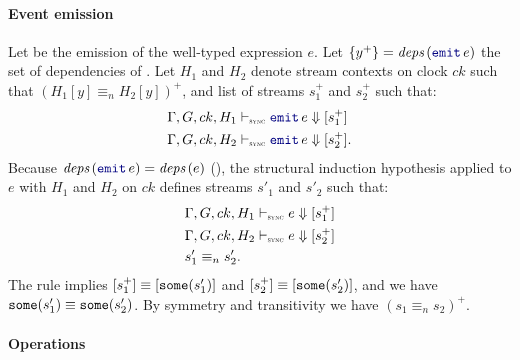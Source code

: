 \begin{skippableproof}
    \paragraph{Event emission}

    Let  be the emission of the well-typed expression $e$. Let $\{y^+\} = \deps{\emit{e}}$
    the set of dependencies of . Let $H_1$ and $H_2$ denote stream contexts on clock $ck$
    such that $(H_1[y] \equiv_n H_2[y])^+$, and list of streams $s_1^+$ and $s_2^+$ such that:
    \begin{align*}
         & \exprDenot{H_1}{ck}{\emit{e}}{s_1^+}  \\
         & \exprDenot{H_2}{ck}{\emit{e}}{s_2^+}.
    \end{align*}
    Because $\deps{\emit{e}} = \deps{e}$ (), the structural induction hypothesis applied to $e$ with $H_1$ and $H_2$ on $ck$
    defines streams $s'_1$ and $s'_2$ such that:
    \begin{align*}
         & \exprDenot{H_1}{ck}{e}{s_1^+} \\
         & \exprDenot{H_2}{ck}{e}{s_2^+} \\
         & s'_1 \equiv_n s'_2.
    \end{align*}
    The rule  implies $[s_1^+] \equiv
        [\some{s'_1}]$ and $[s_2^+] \equiv [\some{s'_2}]$, and we have $\some{s'_1}
        \equiv \some{s'_2}$. By symmetry and transitivity we have $(s_1 \equiv_n s_2)^+$.

    \paragraph{Operations}


\end{skippableproof}
